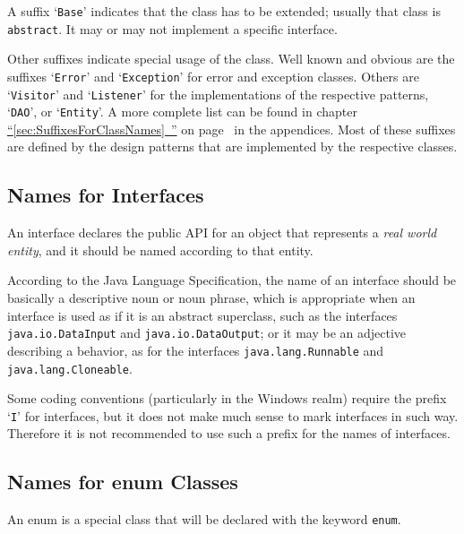 \documentclass[11pt,a4paper, titlepage, parskip=half, headsepline, footsepline, cleardoublepage=current, headheight=1cm]{scrbook}
\newcommand*{\tqfullvref}[1]{\hyperref[{#1}]{“\ref*{#1}~\nameref*{#1}”} on page~\pageref{#1}}
\begin{document}
A suffix ‘\verb#Base#’ indicates that the class has to be extended; usually that class is \lstinline|abstract|. It may or may not implement a specific interface.

Other suffixes indicate special usage of the class. Well known and obvious are the suffixes ‘\verb#Error#’ and ‘\verb#Exception#’ for error and exception classes. Others are ‘\verb#Visitor#’ and ‘\verb#Listener#’ for the implementations of the respective patterns, ‘\verb#DAO#’, or ‘\verb#Entity#’. A more complete list can be found in chapter \tqfullvref{sec:SuffixesForClassNames} in the appendices. Most of these suffixes are defined by the design patterns that are implemented by the respective classes.


\subsection{Names for Interfaces}\label{sec:NamesForInterfaces}
An interface declares the public API for an object that represents a \textit{real world entity}, and it should be named according to that entity.

According to the Java Language Specification\autocite{ORACLE_DOC_LANGUAGE_SPECIFICATION:Declarations}, the name of an interface should be basically a descriptive noun or noun phrase, which is appropriate when an interface is used as if it is an abstract superclass, such as the interfaces \lstinline|java.io.DataInput| and \lstinline|java.io.DataOutput|; or it may be an adjective describing a behavior, as for the interfaces \lstinline|java.lang.Runnable|\autocite{ORACLE_DOC_RUNNABLE_INTERFACE} and \lstinline|java.lang.Cloneable|\autocite{ORACLE_DOC_CLONEABLE_INTERFACE}.

Some coding conventions (particularly in the Windows realm) require the prefix ‘\verb#I#’ for interfaces, but it does not make much sense to mark interfaces in such way. Therefore it is not recommended to use such a prefix for the names of interfaces.


\subsection{Names for enum Classes}\label{sec:NamesForEnumClasses}
An enum is a special class that will be declared with the keyword \lstinline|enum|.
\end{document}
